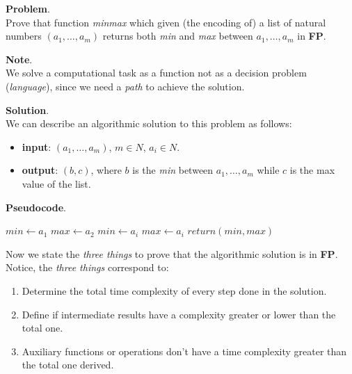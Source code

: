 \begin{example}[title = Computational task as a function]
    \textbf{Problem}. \\
    Prove that function \textit{minmax} which given (the encoding of) a list of natural numbers $(a_1, \dots, a_m)$ returns both \textit{min} and \textit{max}
    between $a_1, \dots, a_m$ in \textbf{FP}. \vspace{14pt}

    \textbf{Note}. \\
    We solve a computational task as a function not as a decision problem (\textit{language}), since we need a \textit{path} to achieve the solution. \vspace{14pt}

    \textbf{Solution}. \\
    We can describe an algorithmic solution to this problem as follows:
    \begin{itemize}
        \renewcommand{\labelitemi}{}
        \item \textbf{input}: $(a_1, \dots, a_m)$, $m \in N$, $a_i \in N$.
        \item \textbf{output}: $(b,c)$, where $b$ is the \textit{min} between $a_1, \dots, a_m$ while $c$ is the max value of the list.
    \end{itemize} \vspace{14pt}

    \textbf{Pseudocode}.
    \begin{algorithmic}
        \State $min \gets a_1$
        \State $max \gets a_2$
                \State $min \gets a_i$
                \State $max \gets a_i$
            \EndIf
        \EndFor
        \State $return(min, max)$
    \end{algorithmic} \vspace{14pt}

    Now we state the \textit{three things} to prove that the algorithmic solution is in \textbf{FP}. Notice, the \textit{three things} correspond to:
    \begin{enumerate}
        \item Determine the total time complexity of every step done in the solution.
        \item Define if intermediate results have a complexity greater or lower than the total one.
        \item Auxiliary functions or operations don't have a time complexity greater than the total one derived.
    \end{enumerate} \vspace{14pt}
    

\end{example}
